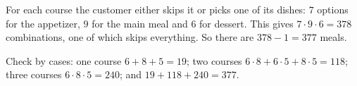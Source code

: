 For each course the customer either skips it or picks one of its dishes: $7$ options for the appetizer, $9$ for the main meal and $6$ for dessert. This gives $7\cdot9\cdot6=378$ combinations, one of which skips everything. So there are $378-1=\boxed{377}$ meals.

Check by cases: one course $6+8+5=19$; two courses $6\cdot8+6\cdot5+8\cdot5=118$; three courses $6\cdot8\cdot5=240$; and $19+118+240=377$.
